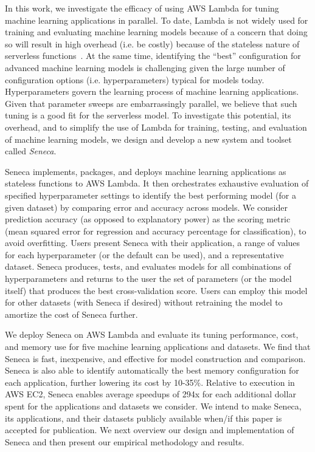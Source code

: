 In this work, we investigate the efficacy of using AWS Lambda
for tuning machine learning applications in parallel.
To date, Lambda is not widely used for training and evaluating
machine learning models because of a concern that 
doing so will result in high overhead (i.e. be costly) because
of the stateless nature of serverless functions~\cite{ref:onesteptwostep}.
At the same time, identifying the ``best'' configuration for advanced
machine learning models is challenging given the large number of configuration
options (i.e. hyperparameters) typical for models today.
Hyperparameters govern the learning process of machine learning applications.
Given that parameter sweeps are embarrassingly parallel, we believe
that such tuning is a good fit for the serverless model.
To investigate this potential, its overhead, and to simplify the 
use of Lambda for training, testing, and evaluation of machine learning models, 
we design and develop a new system and toolset called \textit{Seneca}.

Seneca implements, packages, and deploys 
machine learning applications as stateless functions to AWS Lambda.
It then orchestrates exhaustive evaluation of specified hyperparameter settings
to identify the best performing model (for a given dataset) by
comparing error and accuracy across models.  We consider
prediction accuracy (as opposed to explanatory power) as the
scoring metric (mean squared error for regression 
and accuracy percentage for classification), to avoid overfitting.
Users present Seneca with their application, a range of values for 
each hyperparameter (or the default can be used), and a representative dataset.
Seneca produces, tests, and evaluates models for all combinations 
of hyperparameters and returns to the user
the set of parameters (or the model itself) that produces
the best cross-validation score.
Users can employ this model for other datasets
(with Seneca if desired) without retraining the model to amortize the cost of Seneca further.

We deploy Seneca on AWS Lambda and evaluate its tuning performance, cost,
and memory use for five machine learning applications and datasets. We 
find that Seneca is fast, inexpensive, and effective for model 
construction and comparison. Seneca is also able to identify
automatically the
best memory configuration for each application, further lowering its
cost
by 10-35\%. Relative to execution in AWS EC2, Seneca enables average speedups of 294x for each additional dollar 
spent for the applications and datasets we consider.
We intend to make Seneca, its applications, and their datasets publicly available
when/if this paper is accepted for publication.  
We next overview our design and implementation of Seneca and then
present our empirical methodology and results.

